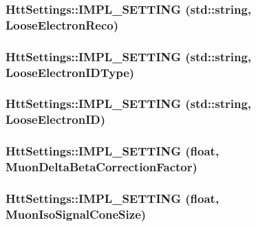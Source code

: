 \label{classHttSettings_aff328a890479ff02d7a8c7b126da3efa}
\hypertarget{classHttSettings_ab63c978173eaa9c4d1d61c992d358e3c}{
\subsubsection[{IMPL\_\-SETTING}]{\setlength{\rightskip}{0pt plus 5cm}HttSettings::IMPL\_\-SETTING (std::string, \/  LooseElectronReco)}}
\label{classHttSettings_ab63c978173eaa9c4d1d61c992d358e3c}
\hypertarget{classHttSettings_a883fd0876b5100a04af373683acc1f25}{
\subsubsection[{IMPL\_\-SETTING}]{\setlength{\rightskip}{0pt plus 5cm}HttSettings::IMPL\_\-SETTING (std::string, \/  LooseElectronIDType)}}
\label{classHttSettings_a883fd0876b5100a04af373683acc1f25}
\hypertarget{classHttSettings_a9d4d24f41e2b5122dbce2e7df7b2ed39}{
\subsubsection[{IMPL\_\-SETTING}]{\setlength{\rightskip}{0pt plus 5cm}HttSettings::IMPL\_\-SETTING (std::string, \/  LooseElectronID)}}
\label{classHttSettings_a9d4d24f41e2b5122dbce2e7df7b2ed39}
\hypertarget{classHttSettings_a380239bb554b50cec815a31e4947e978}{
\subsubsection[{IMPL\_\-SETTING}]{\setlength{\rightskip}{0pt plus 5cm}HttSettings::IMPL\_\-SETTING (float, \/  MuonDeltaBetaCorrectionFactor)}}
\label{classHttSettings_a380239bb554b50cec815a31e4947e978}
\hypertarget{classHttSettings_a15a54c3d01ca1b2297236e75b041f840}{
\subsubsection[{IMPL\_\-SETTING}]{\setlength{\rightskip}{0pt plus 5cm}HttSettings::IMPL\_\-SETTING (float, \/  MuonIsoSignalConeSize)}}
